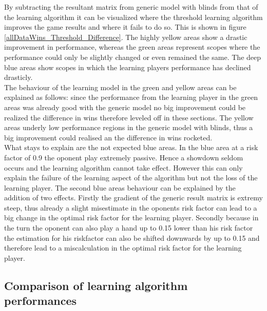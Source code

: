 \documentclass[11pt]{article}
\begin{document}
By subtracting the resultant matrix from generic model with blinds from that of the learning algorithm it can be visualized where the threshold learning algorithm improves the game results and where it fails to do so. This is shown in figure \ref{allDataWins_Threshold_Difference}. The highly yellow areas show a drastic improvement in performance, whereas the green areas represent scopes where the performance could only be slightly changed or even remained the same. The deep blue areas show scopes in which the learning players performance has declined drasticly.\\

The behaviour of the learning model in the green and yellow areas can be explained as follows: since the performance from the learning player in the green areas was already good with the generic model no big improvement could be realized the difference in wins therefore leveled off in these sections. The yellow areas underly low performance regions in the generic model with blinds, thus a big improvement could realised an the difference in wins rocketed.\\

What stays to explain are the not expected blue areas. In the blue area at a risk factor of 0.9 the oponent play extremely passive. Hence a showdown seldom occurs and the learning algorithm cannot take effect. However this can only explain the failure of the learning aspect of the algorithm but not the loss of the learning player. The second blue areas behaviour can be explained by the addition of two effects. Firstly the gradient of the generic result matrix is extremy steep, thus already a slight misestimate in the oponents risk factor can lead to a big change in the optimal risk factor for the learning player. Secondly because in the turn the oponent can also play a hand up to 0.15 lower than his risk factor the estimation for his riskfactor can also be shifted downwards by up to 0.15 and therefore lead to a miscalculation in the optimal risk factor for the learning player.


\subsection{Comparison of learning algorithm performances}
\end{document}
